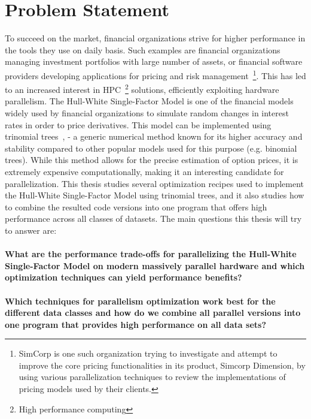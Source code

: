 
\newpage
\section{Problem Statement}
\label{section:problemstatement}
To succeed on the market, financial organizations strive for higher performance in the tools they use on daily basis. Such examples are financial organizations managing investment portfolios with large number of assets, or financial software providers developing applications for pricing and risk management~\footnote{SimCorp is one such organization trying to investigate and attempt to improve the core pricing functionalities in its product, Simcorp Dimension, by using various parallelization techniques to review the implementations of pricing models used by their clients.}. This has led to an increased interest in HPC~\footnote{High performance computing} solutions, efficiently exploiting hardware parallelism. The Hull-White Single-Factor Model is one of the financial models widely used by financial organizations to simulate random changes in interest rates in order to price derivatives. This model can be implemented using trinomial trees~\cite[pg. 444]{ofod}, \cite{uhwirt} - a generic numerical method known for its higher accuracy and stability compared to other popular models used for this purpose (e.g. binomial trees). While this method allows for the precise estimation of option prices, it is extremely expensive computationally, making it an interesting candidate for parallelization. This thesis studies several optimization recipes used to implement the Hull-White Single-Factor Model using trinomial trees, and it also studies how to combine the resulted code versions into one program that offers high performance across all classes of datasets. The main questions this thesis will try to answer are:\\\\
\textbf{What are the performance trade-offs for parallelizing the Hull-White Single-Factor Model on modern massively parallel hardware and which optimization techniques can yield performance benefits?}\\\\
\textbf{Which techniques for parallelism optimization work best for the different data classes and how do we combine all parallel versions into one program that provides high performance on all data sets?}


